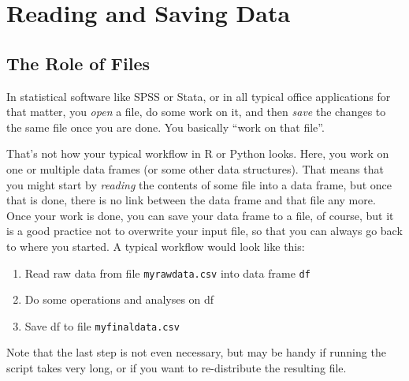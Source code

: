 



\section{Reading and Saving Data}
\label{sec:reading}

\subsection{The Role of Files}\label{sec:files}

In statistical software like SPSS or Stata, or in all typical office applications for that matter, you \emph{open} a file, do some work on it, and then \emph{save} the changes to the same file once you are done. You basically ``work on that file''.

That's not how your typical workflow in R or Python looks.
Here, you work on one or multiple data frames (or some other data structures).
That means that you might start by \emph{reading} the contents of some file into a data frame,
but once that is done, there is no link between the data frame and that file any more.
Once your work is done, you can save your data frame to a file, of course,
but it is a good practice not to overwrite your input file, so that you can always go back to where you started.
A typical workflow would look like this:

\begin{enumerate}
\item Read raw data from file \texttt{\small{myrawdata.csv}} into data frame \texttt{\small{df}}
\item Do some operations and analyses on df
\item Save df to file \texttt{\small{myfinaldata.csv}}
\end{enumerate}
Note that the last step is not even necessary, but may be handy if running the script takes very long, or if you want to re-distribute the resulting file.

